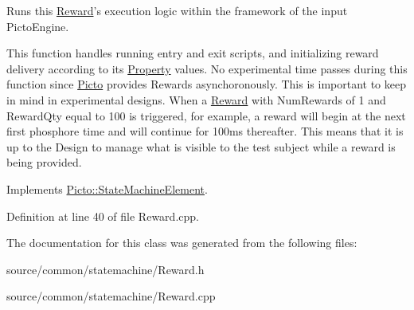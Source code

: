 Runs this \hyperlink{class_picto_1_1_reward}{Reward}'s execution logic within the framework of the input Picto\-Engine. 

This function handles running entry and exit scripts, and initializing reward delivery according to its \hyperlink{class_picto_1_1_property}{Property} values. No experimental time passes during this function since \hyperlink{namespace_picto}{Picto} provides Rewards asynchoronously. This is important to keep in mind in experimental designs. When a \hyperlink{class_picto_1_1_reward}{Reward} with Num\-Rewards of 1 and Reward\-Qty equal to 100 is triggered, for example, a reward will begin at the next first phosphore time and will continue for 100ms thereafter. This means that it is up to the Design to manage what is visible to the test subject while a reward is being provided. 

Implements \hyperlink{class_picto_1_1_state_machine_element_a7a1f1ca8905c111dd043178b9132c770}{Picto\-::\-State\-Machine\-Element}.



Definition at line 40 of file Reward.\-cpp.



The documentation for this class was generated from the following files\-:\begin{DoxyCompactItemize}
\item 
source/common/statemachine/Reward.\-h\item 
source/common/statemachine/Reward.\-cpp\end{DoxyCompactItemize}
